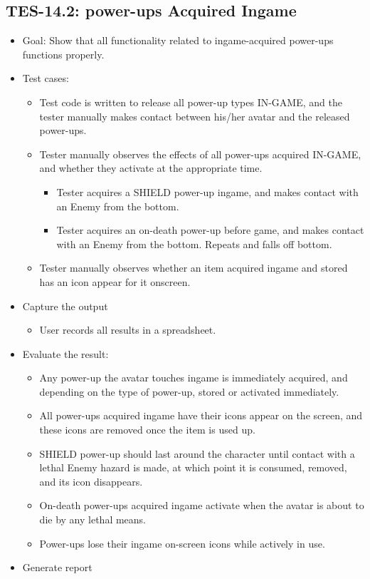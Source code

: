 \subsection{TES-14.2: power-ups Acquired Ingame}
\begin{itemize}
\item Goal: Show that all functionality related to ingame-acquired power-ups functions properly.
\item Test cases: 

\begin{itemize}
\item Test code is written to release all power-up types IN-GAME, and the tester manually makes contact between his/her avatar and
the released power-ups.
\item Tester manually observes the effects of all power-ups acquired IN-GAME, and whether they activate at the appropriate time.
\begin{itemize}
\item Tester acquires a SHIELD power-up ingame, and makes contact with an Enemy from the bottom.
\item Tester acquires an on-death power-up before game, and makes contact with an Enemy from the bottom. Repeats and falls off bottom.
\end{itemize}
\item Tester manually observes whether an item acquired ingame and stored has an icon appear for it onscreen.
\end{itemize}
\item Capture the output 
\begin{itemize}
\item User records all results in a spreadsheet.
\end{itemize}
\item Evaluate the result: 

\begin{itemize}
\item Any power-up the avatar touches ingame is immediately acquired, and depending on the type of power-up, stored or activated immediately.
\item All power-ups acquired ingame have their icons appear on the screen, and these icons are removed once the item is used up.
\item SHIELD power-up should last around the character until contact with a lethal Enemy hazard is made, at which point it is consumed, removed, and its icon disappears.
\item On-death power-ups acquired ingame activate when the avatar is about to die by any lethal means.
\item Power-ups lose their ingame on-screen icons while actively in use.

\end{itemize}
\item Generate report 
\end{itemize}


